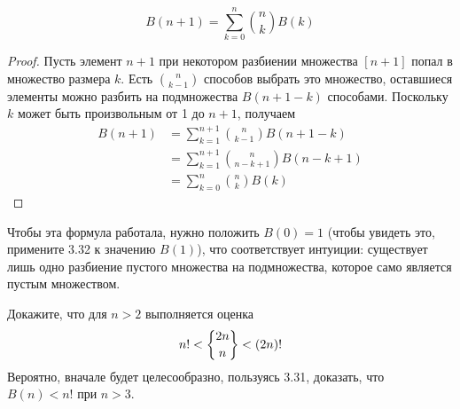 \begin{thm}
$$B(n+1) = \sum_{k=0}^n{n \choose k} B(k)$$
\end{thm}
\begin{proof}
Пусть элемент $n+1$ при некотором разбиении множества $[n+1]$ попал в множество размера $k$. Есть $n\choose k - 1$ способов выбрать это множество, оставшиеся элементы можно разбить на подмножества $B(n+1-k)$ способами. Поскольку $k$ может быть произвольным от 1 до $n+1$, получаем
\begin{align*}
B(n+1) & = \sum_{k=1}^{n+1}{n\choose k-1}B(n+1-k)\\
& = \sum_{k=1}^{n+1}{n\choose n-k+1}B(n-k+1) \\
& = \sum_{k=0}^{n}{n\choose k}B(k)
\end{align*}
\end{proof}

Чтобы эта формула работала, нужно положить $B(0) = 1$ (чтобы увидеть это, примените 3.32 к значению $B(1)$), что соответствует интуиции: существует лишь одно разбиение пустого множества на подмножества, которое само является пустым множеством.

\begin{exercise}
Докажите, что для $n>2$ выполняется оценка
$$n! < \sstirling{2n}{n} < (2n)!$$
Вероятно, вначале будет целесообразно, пользуясь 3.31, доказать, что $B(n) < n!$ при $n>3$.
\end{exercise}
